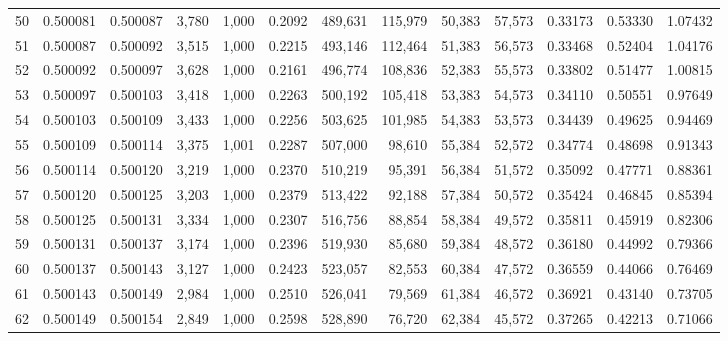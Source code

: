 \begin{tabular}{rrrrrrrrrrrrr}
50  &  0.500081 &  0.500087 &   3,780 &  1,000 &                                     0.2092 &  489,631 &  115,979 &   50,383 &   57,573 &  0.33173 &  0.53330 &  1.07432 \\
51  &  0.500087 &  0.500092 &   3,515 &  1,000 &                                     0.2215 &  493,146 &  112,464 &   51,383 &   56,573 &  0.33468 &  0.52404 &  1.04176 \\
52  &  0.500092 &  0.500097 &   3,628 &  1,000 &                                     0.2161 &  496,774 &  108,836 &   52,383 &   55,573 &  0.33802 &  0.51477 &  1.00815 \\
53  &  0.500097 &  0.500103 &   3,418 &  1,000 &                                     0.2263 &  500,192 &  105,418 &   53,383 &   54,573 &  0.34110 &  0.50551 &  0.97649 \\
54  &  0.500103 &  0.500109 &   3,433 &  1,000 &                                     0.2256 &  503,625 &  101,985 &   54,383 &   53,573 &  0.34439 &  0.49625 &  0.94469 \\
55  &  0.500109 &  0.500114 &   3,375 &  1,001 &                                     0.2287 &  507,000 &   98,610 &   55,384 &   52,572 &  0.34774 &  0.48698 &  0.91343 \\
56  &  0.500114 &  0.500120 &   3,219 &  1,000 &                                     0.2370 &  510,219 &   95,391 &   56,384 &   51,572 &  0.35092 &  0.47771 &  0.88361 \\
57  &  0.500120 &  0.500125 &   3,203 &  1,000 &                                     0.2379 &  513,422 &   92,188 &   57,384 &   50,572 &  0.35424 &  0.46845 &  0.85394 \\
58  &  0.500125 &  0.500131 &   3,334 &  1,000 &                                     0.2307 &  516,756 &   88,854 &   58,384 &   49,572 &  0.35811 &  0.45919 &  0.82306 \\
59  &  0.500131 &  0.500137 &   3,174 &  1,000 &                                     0.2396 &  519,930 &   85,680 &   59,384 &   48,572 &  0.36180 &  0.44992 &  0.79366 \\
60  &  0.500137 &  0.500143 &   3,127 &  1,000 &                                     0.2423 &  523,057 &   82,553 &   60,384 &   47,572 &  0.36559 &  0.44066 &  0.76469 \\
61  &  0.500143 &  0.500149 &   2,984 &  1,000 &                                     0.2510 &  526,041 &   79,569 &   61,384 &   46,572 &  0.36921 &  0.43140 &  0.73705 \\
62  &  0.500149 &  0.500154 &   2,849 &  1,000 &                                     0.2598 &  528,890 &   76,720 &   62,384 &   45,572 &  0.37265 &  0.42213 &  0.71066 \\

\end{tabular}
